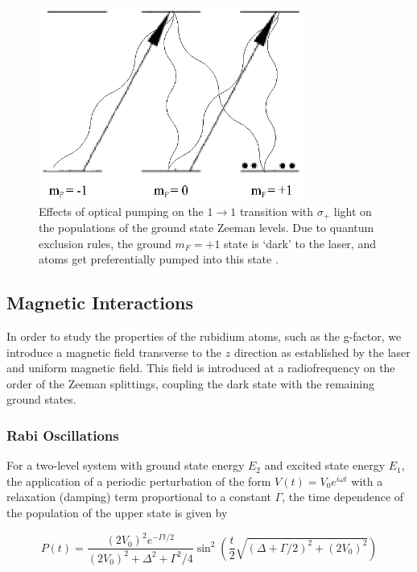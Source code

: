 \begin{figure}[h]
\begin{center}
\includegraphics[height=2.5in]{figures/rbpump.eps}
\caption{\small{Effects of optical pumping on the $1\rightarrow 1$
    transition with $\sigma_+$ light on the populations of the ground
    state Zeeman levels. Due to quantum exclusion rules, the ground
    $m_F = +1$ state is `dark' to the laser, and atoms get
    preferentially pumped into this state \cite{budker}.}}
\label{fig:rbpump}
\end{center}
\end{figure}


\subsection{Magnetic Interactions}

In order to study the properties of the rubidium atoms, such as the
g-factor, we introduce a magnetic field transverse to the $z$
direction as established by the laser and uniform magnetic field. This
field is introduced at a radiofrequency on the order of the Zeeman splittings,
coupling the dark state with the remaining ground states. 

\subsubsection{Rabi Oscillations}\label{rabioscillations}

For a two-level system with ground state energy $E_2$ and excited
state energy $E_1$, the application of a periodic perturbation of the
form $V(t) = V_0e^{i\omega t}$ with a relaxation (damping) term
proportional to a constant $\Gamma$, the time dependence of the
population of the upper state is given by

\begin{equation}
P(t) = \frac{(2V_0)^2e^{-\Gamma t/2}}{(2V_0)^2 +\Delta^2 + \Gamma^2/4}\sin^2(\frac{t}{2}\sqrt{(\Delta + \Gamma/2)^2 + (2V_0)^2}) \label{eqn:rabi}
\end{equation}

